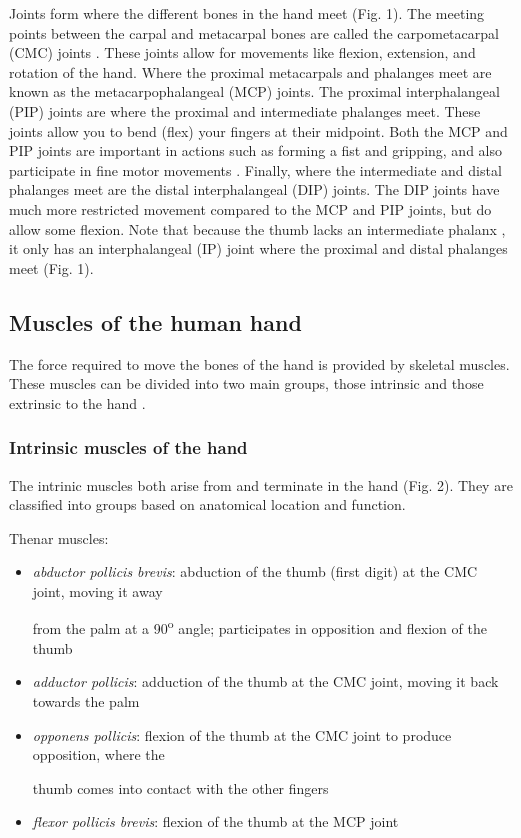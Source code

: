 \documentclass{article}
\begin{document}
Joints form where the different bones in the hand meet \citep{tortora2018principles} (Fig. 1). The meeting points between the carpal and metacarpal bones are called the carpometacarpal (CMC) joints \citep{panchal2013skeletal, ombregt2013applied}. These joints allow for movements like flexion, extension, and rotation of the hand. Where the proximal metacarpals and phalanges meet are known as the metacarpophalangeal (MCP) joints. The proximal interphalangeal (PIP) joints are where the proximal and intermediate phalanges meet. These joints allow you to bend (flex) your fingers at their midpoint. Both the MCP and PIP joints are important in actions such as forming a fist and gripping, and also participate in fine motor movements \citep{duncan2013biomechanics}. Finally, where the intermediate and distal phalanges meet are the distal interphalangeal (DIP) joints. The DIP joints have much more restricted movement compared to the MCP and PIP joints, but do allow some flexion. Note that because the thumb lacks an intermediate phalanx \citep{panchal2013skeletal}, it only has an interphalangeal (IP) joint where the proximal and distal phalanges meet (Fig. 1).

\subsection{Muscles of the human hand}

The force required to move the bones of the hand is provided by skeletal muscles. These muscles can be divided into two main groups, those intrinsic and those extrinsic to the hand \citep{tortora2018principles, ombregt2013applied, openStax_upper}.

\subsubsection{Intrinsic muscles of the hand}

The intrinic muscles both arise from and terminate in the hand \citep{tortora2018principles, ombregt2013applied, schreuders2007intrinsic, openStax_upper} (Fig. 2). They are classified into groups based on anatomical location and function.

Thenar muscles:

\begin{itemize}
\item \textit{abductor pollicis brevis}: abduction of the thumb (first digit) at the CMC joint, moving it away

from the palm at a 90\textsuperscript{o} angle; participates in opposition and flexion of the thumb


\item \textit{adductor pollicis}: adduction of the thumb at the CMC joint, moving it back towards the palm


\item \textit{opponens pollicis}: flexion of the thumb at the CMC joint to produce opposition, where the

thumb comes into contact with the other fingers


\item \textit{flexor pollicis brevis}: flexion of the thumb at the MCP joint
\end{itemize}
\end{document}
